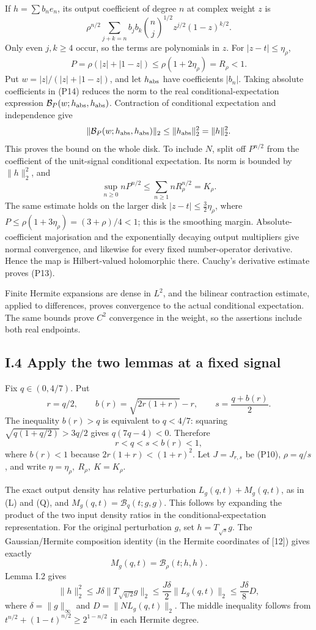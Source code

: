 \documentclass[
  british,
  10pt,
]{article}
\begin{document}
If \(h=\sum b_ne_n\), its output coefficient of degree \(n\) at complex
weight \(z\) is \[
\rho^{n/2}\sum_{j+k=n}b_jb_k\binom nj^{1/2}
z^{j/2}(1-z)^{k/2}.                                    \tag{P14}
\] Only even \(j,k\ge4\) occur, so the terms are polynomials in \(z\).
For \(|z-t|\le\eta_\rho\), \[
P=\rho(|z|+|1-z|)
\le \rho(1+2\eta_\rho)=R_\rho<1.
\] Put \(w=|z|/(|z|+|1-z|)\), and let \(h_{\rm abs}\) have coefficients
\(|b_n|\). Taking absolute coefficients in (P14) reduces the norm to the
real conditional-expectation expression
\(\mathcal B_P(w;h_{\rm abs},h_{\rm abs})\). Contraction of conditional
expectation and independence give \[
\|\mathcal B_P(w;h_{\rm abs},h_{\rm abs})\|_2
\le\|h_{\rm abs}\|_2^2=\|h\|_2^2.
\] This proves the bound on the whole disk. To include \(N\), split off
\(P^{n/2}\) from the coefficient of the unit-signal conditional
expectation. Its norm is bounded by \(\|h\|_2^2\), and \[
\sup_{n\ge0}nP^{n/2}
\le\sum_{n\ge1}nR_\rho^{n/2}=K_\rho.
\] The same estimate holds on the larger disk
\(|z-t|\le\tfrac32\eta_\rho\), where
\(P\le\rho(1+3\eta_\rho)=(3+\rho)/4<1\); this is the smoothing margin.
Absolute-coefficient majorisation and the exponentially decaying output
multipliers give normal convergence, and likewise for every fixed
number-operator derivative. Hence the map is Hilbert-valued holomorphic
there. Cauchy's derivative estimate proves (P13).

Finite Hermite expansions are dense in \(L^2\), and the bilinear
contraction estimate, applied to differences, proves convergence to the
actual conditional expectation. The same bounds prove \(C^2\)
convergence in the weight, so the assertions include both real
endpoints.

\subsection{I.4 Apply the two lemmas at a fixed
signal}\label{i.4-apply-the-two-lemmas-at-a-fixed-signal}

Fix \(q\in(0,4/7)\). Put \[
r=q/2,\qquad b(r)=\sqrt{2r(1+r)}-r,\qquad
s=\frac{q+b(r)}2.
\] The inequality \(b(r)>q\) is equivalent to \(q<4/7\): squaring
\(\sqrt{q(1+q/2)}>3q/2\) gives \(q(7q-4)<0\). Therefore \[
r<q<s<b(r)<1,
\] where \(b(r)<1\) because \(2r(1+r)<(1+r)^2\). Let \(J=J_{r,s}\) be
(P10), \(\rho=q/s\), and write \(\eta=\eta_\rho,\ R_\rho,\ K=K_\rho\).

The exact output density has relative perturbation
\(L_g(q,t)+M_g(q,t)\), as in (L) and (Q), and
\(M_g(q,t)=\mathcal B_q(t;g,g)\). This follows by expanding the product
of the two input density ratios in the conditional-expectation
representation. For the original perturbation \(g\), set
\(h=T_{\sqrt s}g\). The Gaussian/Hermite composition identity (in the
Hermite coordinates of {[}12{]}) gives exactly \[
M_g(q,t)=\mathcal B_\rho(t;h,h).                         \tag{P15}
\] Lemma I.2 gives \[
\|h\|_2^2\le J\delta\|T_{\sqrt{q/2}}g\|_2
\le\frac{J\delta}{2}\|L_g(q,t)\|_2
\le\frac{J\delta}{8}D,                                  \tag{P16}
\] where \(\delta=\|g\|_\infty\) and \(D=\|NL_g(q,t)\|_2\). The middle
inequality follows from \(t^{n/2}+(1-t)^{n/2}\ge2^{1-n/2}\) in each
Hermite degree.
\end{document}
